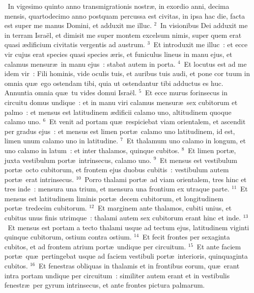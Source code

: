 ~In vigesimo quinto anno transmigrationis nostr\ae , in exordio anni, decima mensis, quartodecimo anno postquam percussa est civitas, in ipsa hac die, facta est super me manus Domini, et adduxit me illuc.
${}^{2}$~In visionibus Dei adduxit me in terram Isra\"el, et dimisit me super montem excelsum nimis, super quem erat quasi \ae dificium civitatis vergentis ad austrum.
${}^{3}$~Et introduxit me illuc~: et ecce vir cujus erat species quasi species \ae ris, et funiculus lineus in manu ejus, et calamus mensur\ae\ in manu ejus~: stabat autem in porta.
${}^{4}$~Et locutus est ad me idem vir~: Fili hominis, vide oculis tuis, et auribus tuis audi, et pone cor tuum in omnia qu\ae\ ego ostendam tibi, quia ut ostendantur tibi adductus es huc. Annuntia omnia qu\ae\ tu vides domui Isra\"el.
${}^{5}$~Et ecce murus forinsecus in circuitu domus undique~: et in manu viri calamus mensur\ae\ sex cubitorum et palmo~: et mensus est latitudinem \ae dificii calamo uno, altitudinem quoque calamo uno.
${}^{6}$~Et venit ad portam qu\ae\ respiciebat viam orientalem, et ascendit per gradus ejus~: et mensus est limen port\ae\ calamo uno latitudinem, id est, limen unum calamo uno in latitudine.
${}^{7}$~Et thalamum uno calamo in longum, et uno calamo in latum~: et inter thalamos, quinque cubitos.
${}^{8}$~Et limen port\ae , juxta vestibulum port\ae\ intrinsecus, calamo uno.
${}^{9}$~Et mensus est vestibulum port\ae\ octo cubitorum, et frontem ejus duobus cubitis~: vestibulum autem port\ae\ erat intrinsecus.
${}^{10}$~Porro thalami port\ae\ ad viam orientalem, tres hinc et tres inde~: mensura una trium, et mensura una frontium ex utraque parte.
${}^{11}$~Et mensus est latitudinem liminis port\ae\ decem cubitorum, et longitudinem port\ae\ tredecim cubitorum.
${}^{12}$~Et marginem ante thalamos, cubiti unius, et cubitus unus finis utrimque~: thalami autem sex cubitorum erant hinc et inde.
${}^{13}$~Et mensus est portam a tecto thalami usque ad tectum ejus, latitudinem viginti quinque cubitorum, ostium contra ostium.
${}^{14}$~Et fecit frontes per sexaginta cubitos, et ad frontem atrium port\ae\ undique per circuitum.
${}^{15}$~Et ante faciem port\ae\ qu\ae\ pertingebat usque ad faciem vestibuli port\ae\ interioris, quinquaginta cubitos.
${}^{16}$~Et fenestras obliquas in thalamis et in frontibus eorum, qu\ae\ erant intra portam undique per circuitum~: similiter autem erant et in vestibulis fenestr\ae\ per gyrum intrinsecus, et ante frontes pictura palmarum.


